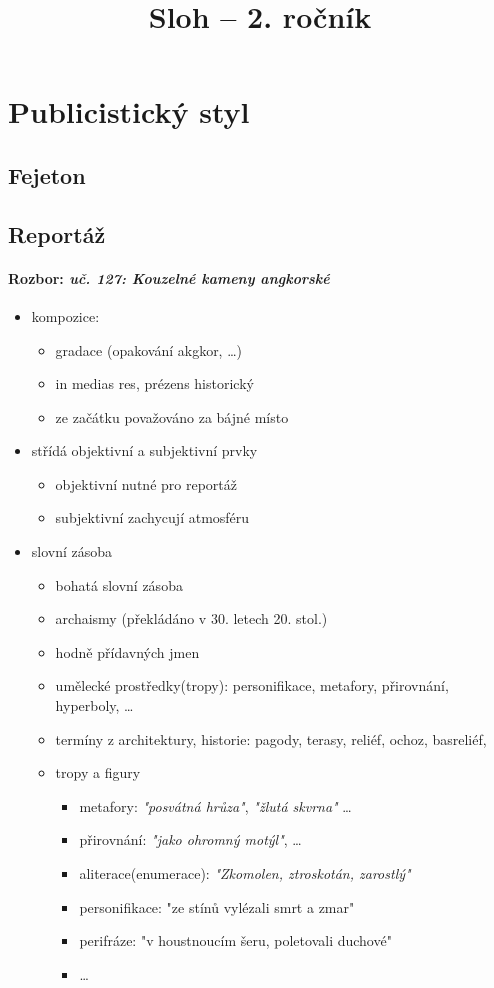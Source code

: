 \title{Sloh -- 2. ročník}



\section{Publicistický styl}


\subsection{Fejeton}
\subsection{Reportáž}
\paragraph{Rozbor: \textit{uč. 127: Kouzelné kameny angkorské}}
\begin{itemize}
\item kompozice: 
\begin{itemize}
	\item gradace (opakování akgkor, \ldots)
	\item in medias res, prézens historický
	\item ze začátku považováno za bájné místo
\end{itemize}
\item střídá objektivní a subjektivní prvky
	\begin{itemize}
	\item objektivní nutné pro reportáž
	\item subjektivní zachycují atmosféru
	\end{itemize}
\item slovní zásoba
\begin{itemize}
	\item bohatá slovní zásoba
	\item archaismy (překládáno v 30. letech 20. stol.)
	\item hodně přídavných jmen
	\item umělecké prostředky(tropy): personifikace, metafory, přirovnání, hyperboly, \ldots
	\item termíny z architektury, historie: pagody, terasy, reliéf, ochoz, basreliéf, 
	\item tropy a figury
		\begin{itemize}
		\item metafory: \textit{"posvátná hrůza"}, \textit{"žlutá skvrna"} \ldots
		\item přirovnání: \textit{"jako ohromný motýl"}, \ldots
		\item aliterace(enumerace): \textit{"Zkomolen, ztroskotán, zarostlý"}
		\item personifikace: "ze stínů vylézali smrt a zmar"
		\item perifráze: "v houstnoucím šeru, poletovali duchové"
		\item \ldots
		\end{itemize}
	\end{itemize}	
\end{itemize}


